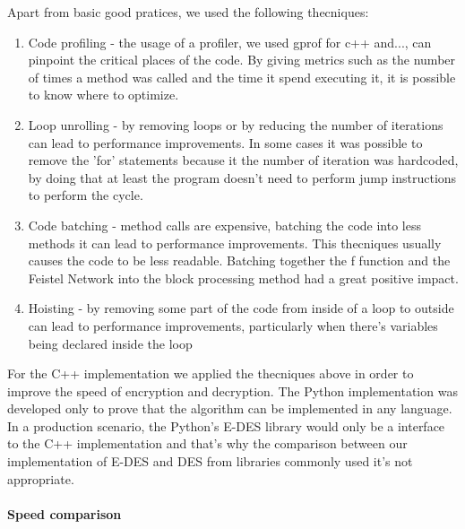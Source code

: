 \documentclass{article} %
\begin{document}
Apart from basic good pratices, we used the following thecniques:
\begin{enumerate}
  \item Code profiling - the usage of a profiler, we used gprof for c++ and..., can pinpoint the critical places of the code. By giving metrics such as the number of 
  times a method was called and the time it spend executing it, it is possible to know where to optimize.
  \item Loop unrolling - by removing loops or by reducing the number of iterations can lead to performance improvements. In some cases it was possible to remove the 'for'
  statements because it the number of iteration was hardcoded, by doing that at least the program doesn't need to perform jump instructions to perform the cycle.
  \item Code batching - method calls are expensive, batching the code into less methods it can lead to performance improvements. This thecniques usually causes the code 
  to be less readable. Batching together the f function and the Feistel Network into the block processing method had a great positive impact.
  \item Hoisting - by removing some part of the code from inside of a loop to outside can lead to performance improvements, particularly when there's variables being
  declared inside the loop
\end{enumerate}

For the C++ implementation we applied the thecniques above in order to improve the speed of encryption and decryption. The Python implementation was developed only to prove that
the algorithm can be implemented in any language. In a production scenario, the Python's E-DES library would only be a interface to the C++ implementation and that's  why the comparison
between our implementation of E-DES and DES from libraries commonly used it's not appropriate.

\paragraph{Speed comparison}
\end{document}
